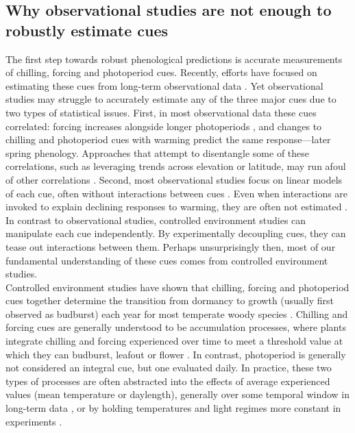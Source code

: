 \documentclass[11pt,letter]{article}
\begin{document}
\subsection{Why observational studies are not enough to robustly estimate cues}
The first step towards robust phenological predictions is accurate measurements of chilling, forcing and photoperiod cues. Recently, efforts have focused on estimating these cues from long-term observational data \citep[e.g.,][]{lued2013diff}. Yet observational studies may struggle to accurately estimate any of the three major cues due to two types of statistical issues. First, in most observational data these cues correlated: forcing increases alongside longer photoperiods \citep{sarahailene2020}, and changes to chilling and photoperiod cues with warming predict the same response---later spring phenology. Approaches that attempt to disentangle some of these correlations, such as leveraging trends across elevation or latitude, may run afoul of other correlations \citep[][]{tansey2017}. Second, most observational studies focus on linear models of each cue, often without interactions between cues \citep{visser2001,polgar2014}. Even when interactions are invoked to explain declining responses to warming, they are often not estimated \citep[e.g.,][]{fu2015}.\\

In contrast to observational studies, controlled environment studies can manipulate each cue independently. By experimentally decoupling cues, they can tease out interactions between them. Perhaps unsurprisingly then, most of our fundamental understanding of these cues comes from controlled environment studies.\\

Controlled environment studies have shown that chilling, forcing and photoperiod cues together determine the transition from dormancy to growth (usually first observed as budburst) each year for most temperate woody species \citep{vanderschoot2014,chuinearees,Singh:2017,chang2021}. Chilling and forcing cues are generally understood to be accumulation processes, where plants integrate chilling and forcing experienced over time to meet a threshold value at which they can budburst, leafout or flower \citep{chuinearees}. In contrast, photoperiod is generally not considered an integral cue, but one evaluated daily. In practice, these two types of processes are often abstracted into the effects of average experienced values (mean temperature or daylength), generally over some temporal window in long-term data \citep[e.g.,][]{Wolkovich:2012n,fu2015}, or by holding temperatures and light regimes more constant in experiments \citep[e.g.,][]{Worrall:1967aa,Heide:1993,Skuterud:1994aa}. \\ %
\end{document}
